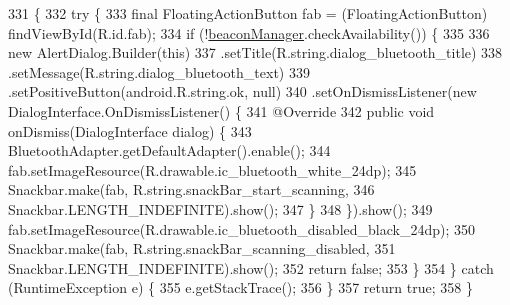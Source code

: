 \begin{DoxyCode}
331                                            \{
332         \textcolor{keywordflow}{try} \{
333             \textcolor{keyword}{final} FloatingActionButton fab = (FloatingActionButton) findViewById(R.id.fab);
334             \textcolor{keywordflow}{if} (!\hyperlink{classit_1_1unibo_1_1torsello_1_1bluetoothpositioning_1_1activities_1_1ApplicationActivity_a973c37226a3dbba6016966c3555aff65_a973c37226a3dbba6016966c3555aff65}{beaconManager}.checkAvailability()) \{
335 
336                 \textcolor{keyword}{new} AlertDialog.Builder(\textcolor{keyword}{this})
337                         .setTitle(R.string.dialog\_bluetooth\_title)
338                         .setMessage(R.string.dialog\_bluetooth\_text)
339                         .setPositiveButton(android.R.string.ok, null)
340                         .setOnDismissListener(\textcolor{keyword}{new} DialogInterface.OnDismissListener() \{
341                             @Override
342                             \textcolor{keyword}{public} \textcolor{keywordtype}{void} onDismiss(DialogInterface dialog) \{
343                                 BluetoothAdapter.getDefaultAdapter().enable();
344                                 fab.setImageResource(R.drawable.ic\_bluetooth\_white\_24dp);
345                                 Snackbar.make(fab, R.string.snackBar\_start\_scanning,
346                                         Snackbar.LENGTH\_INDEFINITE).show();
347                             \}
348                         \}).show();
349                 fab.setImageResource(R.drawable.ic\_bluetooth\_disabled\_black\_24dp);
350                 Snackbar.make(fab, R.string.snackBar\_scanning\_disabled,
351                         Snackbar.LENGTH\_INDEFINITE).show();
352                 \textcolor{keywordflow}{return} \textcolor{keyword}{false};
353             \}
354         \} \textcolor{keywordflow}{catch} (RuntimeException e) \{
355             e.getStackTrace();
356         \}
357         \textcolor{keywordflow}{return} \textcolor{keyword}{true};
358     \}
\end{DoxyCode}
\hypertarget{classit_1_1unibo_1_1torsello_1_1bluetoothpositioning_1_1activities_1_1ApplicationActivity_a0cdfc0658ba462b43e9e6b94bab90da1_a0cdfc0658ba462b43e9e6b94bab90da1}{}\label{classit_1_1unibo_1_1torsello_1_1bluetoothpositioning_1_1activities_1_1ApplicationActivity_a0cdfc0658ba462b43e9e6b94bab90da1_a0cdfc0658ba462b43e9e6b94bab90da1} 
